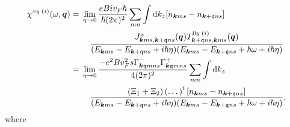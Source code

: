 \begin{equation}
  \begin{split}
    \chi ^{xy \; (i)}(\omega , \vec{q}) &=
    \begin{multlined}[t]
      \lim_{\eta \to 0}
      \frac{eB i v_F \hbar  }{\hbar (2\pi)^2 }
      \sum\limits_{mn}^{} 
      \int \mathrm{d}k_z
      [n_{\vec{k} ms} - n_{\vec{k}+\qvec{q} ns}]\\
      \frac{
        J^x_{\vec{k}ms, \vec{k}+\qvec{q} ns}(\vec{q})
        T^{0y\; (i)}_{\vec{k}+\qvec{q}ns, \vec{k}ms}(\vec{q})
      }{
        (E_{\vec{k} m s} - E_{\vec{k} + \qvec{q} ns} + i \hbar  \eta )
        (E_{\vec{k} m s} - E_{\vec{k} + \qvec{q} ns} + \hbar \omega + i \hbar  \eta )
      }
    \end{multlined}\\
    &=
    \begin{multlined}[t]
      \lim_{\eta \to 0}
      \frac{ -e^2 B v_F^2 s
        \Gamma ^-_{\vec{k} \qvec{q} m n s}
        \Gamma ^+_{\vec{k} \qvec{q} m n s}
      }{4 (2\pi )^2}
      \sum\limits_{mn}^{}  
      \int \mathrm{d}k_z\\
      \frac{
        (\Xi _1 + \Xi _2)
        \left( \dots  \right)^i
        [n_{\vec{k} ms} - n_{\vec{k}+\qvec{q} ns}]
      }{
        (E_{\vec{k} m s} - E_{\vec{k} + \qvec{q} ns} + i \hbar  \eta )
        (E_{\vec{k} m s} - E_{\vec{k} + \qvec{q} ns} + \hbar \omega + i \hbar  \eta )
      },
    \end{multlined}
  \end{split}
\end{equation}
where

